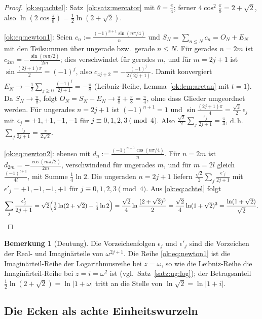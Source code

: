 \documentclass[a4paper,12pt,twoside]{report}
\theoremstyle{definition}
\newtheorem{bemerkung}{Bemerkung}
\begin{document}
\begin{proof}
\eqref{ok:eq:achtel}: Satz~\ref{ok:satz:mercator} mit $\theta=\frac\pi4$; ferner $4\cos^2\frac\pi8=2+\sqrt2$, also $\ln(2\cos\frac\pi8)=\frac12\ln(2+\sqrt2)$.

\eqref{ok:eq:newton1}: Seien $c_n:=\frac{(-1)^{n+1}\sin(n\pi/4)}n$ und $S_N=\sum_{n\le N}c_n=O_N+E_N$ mit den Teilsummen über ungerade bzw.\ gerade $n\le N$. Für gerades $n=2m$ ist $c_{2m}=-\frac{\sin(m\pi/2)}{2m}$; dies verschwindet für gerades $m$, und für $m=2j+1$ ist $\sin\frac{(2j+1)\pi}2=(-1)^j$, also $c_{4j+2}=-\frac{(-1)^j}{2(2j+1)}$. Damit konvergiert $E_N\to-\frac12\sum_{j\ge0}\frac{(-1)^j}{2j+1}=-\frac\pi8$ (Leibniz-Reihe, Lemma~\ref{ok:lem:arctan} mit $t=1$). Da $S_N\to\frac\pi8$, folgt $O_N=S_N-E_N\to\frac\pi8+\frac\pi8=\frac\pi4$, ohne dass Glieder umgeordnet werden. Für ungerades $n=2j+1$ ist $(-1)^{n+1}=1$ und $\sin\frac{(2j+1)\pi}4=\frac{\sqrt2}2\,\epsilon_j$ mit $\epsilon_j=+1,+1,-1,-1$ für $j\equiv0,1,2,3\pmod 4$. Also $\frac{\sqrt2}2\sum_j\frac{\epsilon_j}{2j+1}=\frac\pi4$, d.\,h.\ $\sum_j\frac{\epsilon_j}{2j+1}=\frac{\pi}{2\sqrt2}$.

\eqref{ok:eq:newton2}: ebenso mit $d_n:=\frac{(-1)^{n+1}\cos(n\pi/4)}n$. Für $n=2m$ ist $d_{2m}=-\frac{\cos(m\pi/2)}{2m}$, verschwindend für ungerades $m$, und für $m=2l$ gleich $\frac{(-1)^{l+1}}{4l}$, mit Summe $\frac14\ln2$. Die ungeraden $n=2j+1$ liefern $\frac{\sqrt2}2\sum_j\frac{\epsilon'_j}{2j+1}$ mit $\epsilon'_j=+1,-1,-1,+1$ für $j\equiv0,1,2,3\pmod4$. Aus \eqref{ok:eq:achtel} folgt
\[
\sum_j\frac{\epsilon'_j}{2j+1}=\sqrt2\Bigl(\tfrac12\ln(2+\sqrt2)-\tfrac14\ln2\Bigr)=\frac{\sqrt2}4\ln\frac{(2+\sqrt2)^2}2=\frac{\sqrt2}4\ln(1+\sqrt2)^2=\frac{\ln(1+\sqrt2)}{\sqrt2}.\qedhere
\]
\end{proof}

\begin{bemerkung}[Deutung]
Die Vorzeichenfolgen $\epsilon_j$ und $\epsilon'_j$ sind die Vorzeichen der Real- und Imaginärteile von $\omega^{2j+1}$. Die Reihe \eqref{ok:eq:newton1} ist die Imaginärteil-Reihe der Logarithmusreihe bei $z=\omega$, so wie die Leibniz-Reihe die Imaginärteil-Reihe bei $z=i=\omega^2$ ist (vgl.\ Satz~\ref{satz:ug:log}); der Betragsanteil $\frac12\ln(2+\sqrt2)=\ln|1+\omega|$ tritt an die Stelle von $\ln\sqrt2=\ln|1+i|$.
\end{bemerkung}

\subsection{Die Ecken als achte Einheitswurzeln}
\label{sec:ok:einheit}
\end{document}
